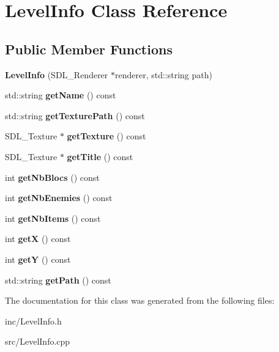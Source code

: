 \hypertarget{class_level_info}{}\section{Level\+Info Class Reference}
\label{class_level_info}
\subsection*{Public Member Functions}
\begin{DoxyCompactItemize}
\item 
\mbox{\label{class_level_info_a86e2652331ff702f34ca4f4ebc15d338}} 
{\bfseries Level\+Info} (S\+D\+L\+\_\+\+Renderer $\ast$renderer, std\+::string path)
\item 
\mbox{\label{class_level_info_ac9518b7c6f726a38957459a7bedd9bc9}} 
std\+::string {\bfseries get\+Name} () const
\item 
\mbox{\label{class_level_info_a05aff7b06c20d990a09ada4da9580473}} 
std\+::string {\bfseries get\+Texture\+Path} () const
\item 
\mbox{\label{class_level_info_af46677a45e615d9de28122bd093393fd}} 
S\+D\+L\+\_\+\+Texture $\ast$ {\bfseries get\+Texture} () const
\item 
\mbox{\label{class_level_info_aa7edddbe4108dd2de54121b8ec5cccc6}} 
S\+D\+L\+\_\+\+Texture $\ast$ {\bfseries get\+Title} () const
\item 
\mbox{\label{class_level_info_a7548542427cbdcf497b13024a2720c62}} 
int {\bfseries get\+Nb\+Blocs} () const
\item 
\mbox{\label{class_level_info_a9b93fe9fe8d26e34fb2ffec0c6f7922a}} 
int {\bfseries get\+Nb\+Enemies} () const
\item 
\mbox{\label{class_level_info_ae06e269d2f530db2b5e720ea6cf5663b}} 
int {\bfseries get\+Nb\+Items} () const
\item 
\mbox{\label{class_level_info_a0314d367b236ca018b93f1161d0293bb}} 
int {\bfseries getX} () const
\item 
\mbox{\label{class_level_info_ac36b16c35597dfc905ab9e771887084f}} 
int {\bfseries getY} () const
\item 
\mbox{\label{class_level_info_ae209f49236d395c07ddf6df24f4cfe81}} 
std\+::string {\bfseries get\+Path} () const
\end{DoxyCompactItemize}


The documentation for this class was generated from the following files\+:\begin{DoxyCompactItemize}
\item 
inc/Level\+Info.\+h\item 
src/Level\+Info.\+cpp\end{DoxyCompactItemize}
